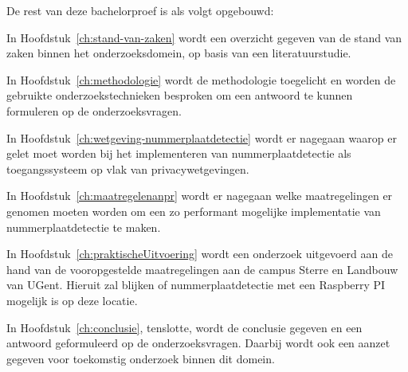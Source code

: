 
De rest van deze bachelorproef is als volgt opgebouwd:

In Hoofdstuk~\ref{ch:stand-van-zaken} wordt een overzicht gegeven van de stand van zaken binnen het onderzoeksdomein, op basis van een literatuurstudie.

In Hoofdstuk~\ref{ch:methodologie} wordt de methodologie toegelicht en worden de gebruikte onderzoekstechnieken besproken om een antwoord te kunnen formuleren op de onderzoeksvragen.

In Hoofdstuk~\ref{ch:wetgeving-nummerplaatdetectie} wordt er nagegaan waarop er gelet moet worden bij het implementeren van nummerplaatdetectie als toegangssysteem op vlak van privacywetgevingen.

In Hoofdstuk~\ref{ch:maatregelenanpr} wordt er nagegaan welke maatregelingen er genomen moeten worden om een zo performant mogelijke implementatie van nummerplaatdetectie te maken.

In Hoofdstuk~\ref{ch:praktischeUitvoering} wordt een onderzoek uitgevoerd aan de hand van de vooropgestelde maatregelingen aan de campus Sterre en Landbouw van UGent. Hieruit zal blijken of nummerplaatdetectie met een Raspberry PI mogelijk is op deze locatie.

In Hoofdstuk~\ref{ch:conclusie}, tenslotte, wordt de conclusie gegeven en een antwoord geformuleerd op de onderzoeksvragen. Daarbij wordt ook een aanzet gegeven voor toekomstig onderzoek binnen dit domein.